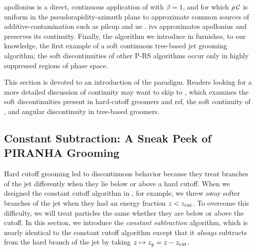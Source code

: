 \gls{apollonius} is a direct, continuous application of  with \(\beta = 1\), and for which \(\rho\,\mathcal{C}\) is uniform in the pseudorapidity-azimuth plane to approximate common sources of \gls{additive-contamination} such as \gls{pileup} and \gls{ue} \cite{Soyez:2018opl,Monk:2018clo,Sjostrand:1987su,Sjostrand:2014zea,Dasgupta:2007wa,Kirchgaesser:2020poq,Moraes:2007rq,CDF:2015txs,Larkoski:2021hee,Baron:2020xoi,Marzani:2017kqd}.
%
\gls{ivs} approximates \gls{apollonius} and preserves its continuity.
%
Finally, the  algorithm we introduce in  furnishes, to our knowledge, the first example of a soft continuous tree-based jet grooming algorithm;
%
the soft discontinuities of other P-RS algorithms occur only in highly suppressed regions of phase space.


This section is devoted to an introduction of the \PIRANHA{} paradigm.
%
Readers looking for a more detailed discussion of continuity may want to skip to , which examines the soft discontinuities present in hard-cutoff groomers and \gls{rsf}, the soft continuity of , and angular discontinuity in tree-based groomers.



\subsection[Constant Subtraction: A Sneak Peek of \textsc{Piranha} Grooming]{Constant Subtraction: A Sneak Peek of PIRANHA Grooming}
\label{sec:constant-subtraction}


Hard cutoff grooming led to discontinuous behavior because they treat branches of the jet differently when they lie below or above a hard cutoff.
%
When we designed the constant cutoff algorithm in , for example, we threw away softer branches of the jet when they had an energy fraction \(z < z_{\rm cut}\).
%
To overcome this difficulty, we will treat particles the same whether they are below or above the cutoff.
%
In this section, we introduce the \emph{constant subtraction} algorithm, which is nearly identical to the constant cutoff algorithm except that it \textit{always} subtracts from the hard branch of the jet by taking \(z \mapsto z_g = z - z_{\rm cut}\).



